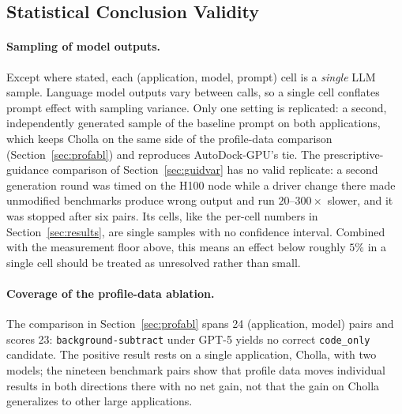 \subsection{Statistical Conclusion Validity}
\paragraph{Sampling of model outputs.}
Except where stated, each (application, model, prompt) cell is a \emph{single} LLM sample. Language
model outputs vary between calls, so a single cell conflates prompt effect with sampling variance.
Only one setting is replicated: a second, independently generated sample of the baseline prompt on
both applications, which keeps Cholla on the same side of the profile-data comparison
(Section~\ref{sec:profabl}) and reproduces AutoDock-GPU's tie. The prescriptive-guidance comparison of
Section~\ref{sec:guidvar} has no valid replicate: a second generation round was timed on the H100 node
while a driver change there made unmodified benchmarks produce wrong output and run $20$--$300\times$
slower, and it was stopped after six pairs. Its cells, like the per-cell numbers in
Section~\ref{sec:results}, are single samples with no confidence interval. Combined
with the measurement floor above, this means an effect below roughly $5\%$ in a single cell should be
treated as unresolved rather than small.

\paragraph{Coverage of the profile-data ablation.}
The comparison in Section~\ref{sec:profabl} spans 24 (application, model) pairs and scores 23:
\texttt{background-subtract} under GPT-5 yields no correct \texttt{code\_only} candidate. The positive
result rests on a single application, Cholla, with two models; the nineteen benchmark pairs show that
profile data moves individual results in both directions there with no net gain, not that the gain on
Cholla generalizes to other large applications.

